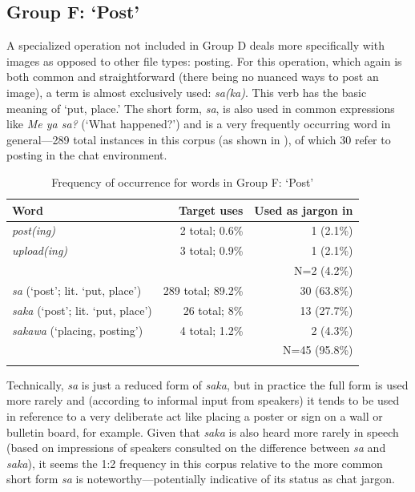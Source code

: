 \documentclass[output=paper
,newtxmath
,modfonts
,nonflat]{langsci/langscibook}
\begin{document}
\subsection{Group F: ‘Post’}

A specialized operation not included in Group D deals more specifically with images as opposed to other file types: posting. For this operation, which again is both common and straightforward (there being no nuanced ways to post an image), a  term is almost exclusively used: \textit{sa(ka)}. This verb has the basic meaning of ‘put, place.’ The short form, \textit{sa}, is also used in common expressions like \textit{Me ya sa?} (‘What happened?’) and is a very frequently occurring word in general—289 total instances in this corpus (as shown in ), of which 30 refer to posting in the chat environment. 

\begin{table}
\begin{tabularx}{\textwidth}{Qrr}
\lsptoprule
Word & Target uses & Used as jargon in \\
\midrule
\textit{post(ing)}   & 2 total; 0.6\% & 1 (2.1\%)\\
\textit{upload(ing)} & 3 total; 0.9\% & 1 (2.1\%)\\\midrule
& & N=2 (4.2\%)\\\midrule
\textit{sa} (‘post’; lit. ‘put, place’)   & 289 total; 89.2\% & 30 (63.8\%)\\
\textit{saka} (‘post’; lit. ‘put, place’) & 26 total; 8\% & 13 (27.7\%)\\
\textit{sakawa} (‘placing, posting’)      & 4 total; 1.2\% & 2 (4.3\%)\\\midrule
& & N=45 (95.8\%)\\
\lspbottomrule
\end{tabularx}
\caption{Frequency of occurrence for words in Group F: ‘Post’}
\label{tab:purvis:8}
\end{table} 

Technically, \textit{sa} is just a reduced form of \textit{saka}, but in practice the full form is used more rarely and (according to informal input from  speakers) it tends to be used in reference to a very deliberate act like placing a poster or sign on a wall or bulletin board, for example. Given that \textit{saka} is also heard more rarely in speech (based on impressions of  speakers consulted on the difference between \textit{sa} and \textit{saka}), it seems the 1:2 frequency in this corpus relative to the more common short form \textit{sa} is noteworthy—potentially indicative of its status as chat jargon.
\end{document}
